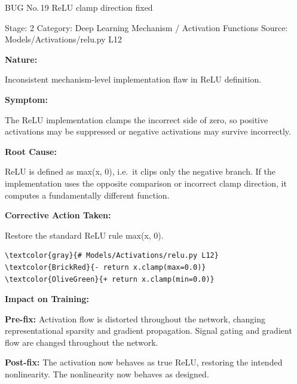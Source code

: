 \documentclass[10pt]{article}
\newcommand{\FieldLabel}[1]{%
 {\bfseries #1:}\par
}
\begin{document}
\begin{bugbox}{BUG No.\,19 \quad ReLU clamp direction fixed}
{\color{MetaGray}\small Stage: 2 \;\textbar\; Category: Deep Learning Mechanism / Activation Functions \;\textbar\; Source: Models/Activations/relu.py L12\par}
\vspace{0.22em}
\FieldLabel{Nature}
Inconsistent mechanism-level implementation flaw in ReLU definition.
\par
\vspace{0.35em}
\FieldLabel{Symptom}
The ReLU implementation clamps the incorrect side of zero, so positive activations may be suppressed or negative activations may survive incorrectly.
\par
\vspace{0.35em}
\FieldLabel{Root Cause}
ReLU is defined as max(x, 0), i.e.~it clips only the negative branch. If the implementation uses the opposite comparison or incorrect clamp direction, it computes a fundamentally different function.
\par
\vspace{0.35em}
\FieldLabel{Corrective Action Taken}
Restore the standard ReLU rule max(x, 0).
\par
\vspace{0.35em}
\begin{Verbatim}[commandchars=\\\{\},fontsize=\footnotesize,breaklines=true,breaksymbol={},frame=leftline,framerule=2pt,rulecolor=\color{gray!40},xleftmargin=6pt,formatcom=\singlespacing]
\textcolor{gray}{# Models/Activations/relu.py L12}
\textcolor{BrickRed}{- return x.clamp(max=0.0)}
\textcolor{OliveGreen}{+ return x.clamp(min=0.0)}
\end{Verbatim}
\vspace{0.22em}
\FieldLabel{Impact on Training}
\textbf{Pre-fix:} Activation flow is distorted throughout the network, changing representational sparsity and gradient propagation. Signal gating and gradient flow are changed throughout the network. \par\smallskip
\textbf{Post-fix:} The activation now behaves as true ReLU, restoring the intended nonlinearity. The nonlinearity now behaves as designed. 
\par
\vspace{0.35em}
\end{bugbox}
\end{document}
